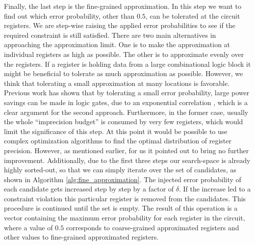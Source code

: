 \documentclass[10pt,twocolumn]{IEEEtran} %
\begin{document}
Finally, the last step is the fine-grained approximation. In this step we want to find out which error probability, other than $0.5$, can be tolerated at the circuit registers. We are step-wise raising the applied error probabilities to see if the required constraint is still satisfied. There are two main alternatives in approaching the approximation limit. One is to make the approximation at individual registers as high as possible. The other is to approximate evenly over the registers. If a register is holding data from a large combinational logic block it might be beneficial to tolerate as much approximation as possible. However, we think that tolerating a small approximation at many locations is favorable. Previous work has shown that by tolerating a small error probability, large power savings can be made in logic gates, due to an exponential correlation \cite{korkmaz2006advocating}, which is a clear argument for the second approach. Furthermore, in the former case, usually the whole ``imprecision budget'' is consumed by very few registers, which would limit the significance of this step. At this point it would be possible to use complex optimization algorithms to find the optimal distribution of register precision. However, as mentioned earlier, for us it pointed out to bring no further improvement. Additionally, due to the first three steps our search-space is already highly sorted-out, so that we can simply iterate over the set of candidates, as shown in Algorithm \ref{alg:fine_approximation}. The injected error probability of each candidate gets increased step by step by a factor of $\delta$. If the increase led to a constraint violation this particular register is removed from the candidates. This procedure is continued until the set is empty. The result of this operation is a vector containing the maximum error probability for each register in the circuit, where a value of $0.5$ corresponds to coarse-grained approximated registers and other values to fine-grained approximated registers.
\end{document}

